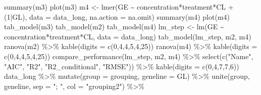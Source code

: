 \documentclass[
  letterpaper,
  DIV=11,
  numbers=noendperiod]{scrartcl}
\newenvironment{Shaded}{\begin{snugshade}}{\end{snugshade}}
\newcommand{\AttributeTok}[1]{\textcolor[rgb]{0.40,0.45,0.13}{#1}}
\newcommand{\DecValTok}[1]{\textcolor[rgb]{0.68,0.00,0.00}{#1}}
\newcommand{\FunctionTok}[1]{\textcolor[rgb]{0.28,0.35,0.67}{#1}}
\newcommand{\NormalTok}[1]{\textcolor[rgb]{0.00,0.23,0.31}{#1}}
\newcommand{\OtherTok}[1]{\textcolor[rgb]{0.00,0.23,0.31}{#1}}
\newcommand{\SpecialCharTok}[1]{\textcolor[rgb]{0.37,0.37,0.37}{#1}}
\newcommand{\StringTok}[1]{\textcolor[rgb]{0.13,0.47,0.30}{#1}}
\begin{document}
\begin{Shaded}
\begin{Highlighting}[]
\FunctionTok{summary}\NormalTok{(m3)}
\FunctionTok{plot}\NormalTok{(m3)}
\NormalTok{m4 }\OtherTok{\textless{}{-}} \FunctionTok{lmer}\NormalTok{(GE }\SpecialCharTok{\textasciitilde{}}\NormalTok{ concentration}\SpecialCharTok{*}\NormalTok{treatment}\SpecialCharTok{*}\NormalTok{CL }\SpecialCharTok{+}\NormalTok{ (}\DecValTok{1}\SpecialCharTok{|}\NormalTok{GL), }\AttributeTok{data =}\NormalTok{ data\_long, }\AttributeTok{na.action =}\NormalTok{ na.omit)}
\FunctionTok{summary}\NormalTok{(m4)}
\FunctionTok{plot}\NormalTok{(m4)}
\FunctionTok{tab\_model}\NormalTok{(m3)}
\FunctionTok{tab\_model}\NormalTok{(m2)}
\FunctionTok{tab\_model}\NormalTok{(m4)}
\NormalTok{lm\_step }\OtherTok{\textless{}{-}} \FunctionTok{lm}\NormalTok{(GE }\SpecialCharTok{\textasciitilde{}}\NormalTok{ concentration}\SpecialCharTok{*}\NormalTok{treatment}\SpecialCharTok{*}\NormalTok{CL, }\AttributeTok{data =}\NormalTok{ data\_long)}
\FunctionTok{tab\_model}\NormalTok{(lm\_step, m2, m4)}
\FunctionTok{ranova}\NormalTok{(m2) }\SpecialCharTok{\%\textgreater{}\%} 
  \FunctionTok{kable}\NormalTok{(}\AttributeTok{digits =} \FunctionTok{c}\NormalTok{(}\DecValTok{0}\NormalTok{,}\DecValTok{4}\NormalTok{,}\DecValTok{4}\NormalTok{,}\DecValTok{5}\NormalTok{,}\DecValTok{4}\NormalTok{,}\DecValTok{25}\NormalTok{))}
\FunctionTok{ranova}\NormalTok{(m4) }\SpecialCharTok{\%\textgreater{}\%} 
  \FunctionTok{kable}\NormalTok{(}\AttributeTok{digits =} \FunctionTok{c}\NormalTok{(}\DecValTok{0}\NormalTok{,}\DecValTok{4}\NormalTok{,}\DecValTok{4}\NormalTok{,}\DecValTok{5}\NormalTok{,}\DecValTok{4}\NormalTok{,}\DecValTok{25}\NormalTok{))}
\FunctionTok{compare\_performance}\NormalTok{(lm\_step, m2, m4) }\SpecialCharTok{\%\textgreater{}\%} 
  \FunctionTok{select}\NormalTok{(}\FunctionTok{c}\NormalTok{(}\StringTok{"Name"}\NormalTok{, }\StringTok{"AIC"}\NormalTok{, }\StringTok{"R2"}\NormalTok{, }\StringTok{"R2\_conditional"}\NormalTok{, }\StringTok{"RMSE"}\NormalTok{)) }\SpecialCharTok{\%\textgreater{}\%} 
  \FunctionTok{kable}\NormalTok{(}\AttributeTok{digits =} \FunctionTok{c}\NormalTok{(}\DecValTok{0}\NormalTok{,}\DecValTok{4}\NormalTok{,}\DecValTok{7}\NormalTok{,}\DecValTok{7}\NormalTok{,}\DecValTok{6}\NormalTok{))}
\NormalTok{data\_long }\SpecialCharTok{\%\textgreater{}\%}
  \FunctionTok{mutate}\NormalTok{(}\AttributeTok{group =}\NormalTok{ grouping,}
         \AttributeTok{geneline =}\NormalTok{ GL) }\SpecialCharTok{\%\textgreater{}\%}
  \FunctionTok{unite}\NormalTok{(group, geneline, }\AttributeTok{sep =} \StringTok{"; "}\NormalTok{, }\AttributeTok{col =} \StringTok{"grouping2"}\NormalTok{) }\SpecialCharTok{\%\textgreater{}\%}

\end{Highlighting}
\end{Shaded}
\end{document}
